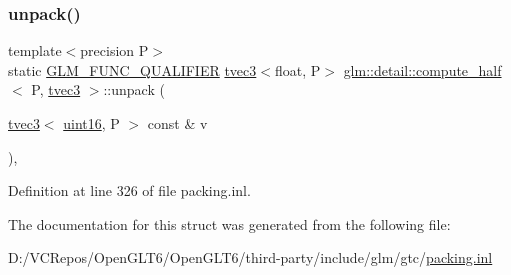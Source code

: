 \subsubsection{\texorpdfstring{unpack()}{unpack()}}
{\footnotesize\ttfamily template$<$precision P$>$ \\
static \mbox{\hyperlink{setup_8hpp_a33fdea6f91c5f834105f7415e2a64407}{G\+L\+M\+\_\+\+F\+U\+N\+C\+\_\+\+Q\+U\+A\+L\+I\+F\+I\+ER}} \mbox{\hyperlink{structglm_1_1tvec3}{tvec3}}$<$float, P$>$ \mbox{\hyperlink{structglm_1_1detail_1_1compute__half}{glm\+::detail\+::compute\+\_\+half}}$<$ P, \mbox{\hyperlink{structglm_1_1tvec3}{tvec3}} $>$\+::unpack (\begin{DoxyParamCaption}\item[{\mbox{\hyperlink{structglm_1_1tvec3}{tvec3}}$<$ \mbox{\hyperlink{namespaceglm_1_1detail_a47b2a7d006d187338e8031a352d1ce56}{uint16}}, P $>$ const \&}]{v }\end{DoxyParamCaption})\hspace{0.3cm}{\ttfamily [inline]}, {\ttfamily [static]}}



Definition at line 326 of file packing.\+inl.



The documentation for this struct was generated from the following file\+:\begin{DoxyCompactItemize}
\item 
D\+:/\+V\+C\+Repos/\+Open\+G\+L\+T6/\+Open\+G\+L\+T6/third-\/party/include/glm/gtc/\mbox{\hyperlink{packing_8inl}{packing.\+inl}}\end{DoxyCompactItemize}
